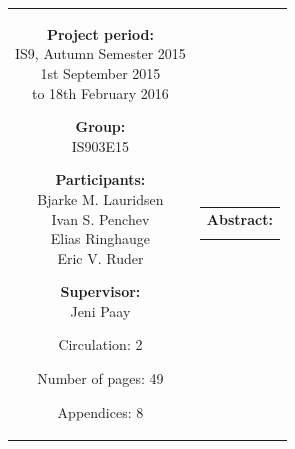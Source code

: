 \begin{nopagebreak}
{\begin{tabular}{cc}
{\begin{description}
\end{description}

\parbox{8cm}{

\begin{description}[itemsep=10pt, topsep=12pt, partopsep=0pt]
\item {\textbf{Project period:}}\\
   IS9, Autumn Semester 2015\\
   1st September 2015 \\
   to 18th February 2016
  \hspace{4cm}
\item {\textbf{Group:}}\\
  IS903E15
  \hspace{4cm}
\item {\textbf{Participants:}} \\
  Bjarke M. Lauridsen\\
  Ivan S. Penchev\\
  Elias Ringhauge\\
  Eric V. Ruder
  \hspace{2cm}
\item {\textbf{Supervisor:}}\\
  Jeni Paay
\end{description}
}
\begin{description}
\item { Circulation: 2 }
\item { Number of pages: 49 }
\item { Appendices: 8} 
\end{description}
\vfill } &
\parbox{7cm}{
  \vspace{.15cm}
  \hfill 
  \begin{tabular}{l}
  {\textbf{Abstract:}}\bigskip \\
  \fbox{
    \parbox{6.5cm}{\bigskip
     {\vfill{\small 
     \bigskip}}
     }}
   \end{tabular}}
\end{tabular}}
\vspace{1.3cm}
\end{nopagebreak}
